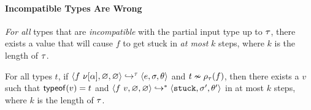 \paragraph{Incompatible Types Are Wrong}
\emph{For all} types that are \emph{incompatible} with the
partial input type up to $\tau$, there exists a value
that will cause $f$ to get stuck in \emph{at most} $k$ steps,
where $k$ is the length of $\tau$.

\begin{lem}
\label{lem:k-stuck}
For all types $t$,
if $\langle f\ \nu[\alpha], \varnothing, \varnothing \rangle \hookrightarrow^{\tau} \langle e, \sigma, \theta \rangle$ and
   $t \nsim \rho_{\tau}(f)$,
   then there exists a $v$ such that $\mathsf{typeof}(v) = {t}$ and
   $\langle f\ v, \varnothing, \varnothing \rangle \hookrightarrow^{*} \langle \mathtt{stuck}, \sigma', \theta' \rangle{}$ in at most
   $k$ steps, where $k$ is the length of $\tau$.
\end{lem}

